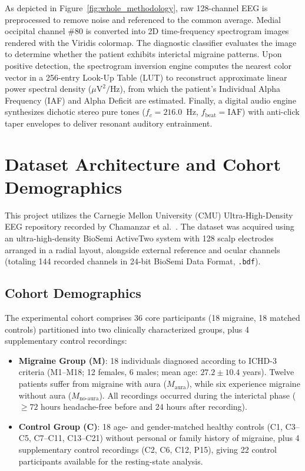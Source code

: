 \documentclass[12pt, a4paper]{report}
\begin{document}
As depicted in Figure~\ref{fig:whole_methodology}, raw 128-channel EEG is preprocessed to remove noise and referenced to the common average. Medial occipital channel \#80 is converted into 2D time-frequency spectrogram images rendered with the Viridis colormap. The diagnostic classifier evaluates the image to determine whether the patient exhibits interictal migraine patterns. Upon positive detection, the spectrogram inversion engine computes the nearest color vector in a 256-entry Look-Up Table (LUT) to reconstruct approximate linear power spectral density ($\mu\text{V}^2/\text{Hz}$), from which the patient's Individual Alpha Frequency (IAF) and Alpha Deficit are estimated. Finally, a digital audio engine synthesizes dichotic stereo pure tones ($f_c = 216.0$~Hz, $f_{\text{beat}} = \text{IAF}$) with anti-click taper envelopes to deliver resonant auditory entrainment.

\section{Dataset Architecture and Cohort Demographics}
\label{sec:dataset_architecture}
This project utilizes the Carnegie Mellon University (CMU) Ultra-High-Density EEG repository recorded by Chamanzar et al.~\cite{chamanzar2021uhd}. The dataset was acquired using an ultra-high-density BioSemi ActiveTwo system with 128 scalp electrodes arranged in a radial layout, alongside external reference and ocular channels (totaling 144 recorded channels in 24-bit BioSemi Data Format, \texttt{.bdf}).

\subsection{Cohort Demographics}
The experimental cohort comprises 36 core participants (18 migraine, 18 matched controls) partitioned into two clinically characterized groups, plus 4 supplementary control recordings:
\begin{itemize}
    \item \textbf{Migraine Group ($\boldsymbol{M}$)}: 18 individuals diagnosed according to ICHD-3 criteria (M1--M18; 12 females, 6 males; mean age: $27.2 \pm 10.4$ years). Twelve patients suffer from migraine with aura ($M_{\text{aura}}$), while six experience migraine without aura ($M_{\text{no-aura}}$). All recordings occurred during the interictal phase ($\ge 72$ hours headache-free before and 24 hours after recording).
    \item \textbf{Control Group ($\boldsymbol{C}$)}: 18 age- and gender-matched healthy controls (C1, C3--C5, C7--C11, C13--C21) without personal or family history of migraine, plus 4 supplementary control recordings (C2, C6, C12, P15), giving 22 control participants available for the resting-state analysis.
\end{itemize}
\end{document}
